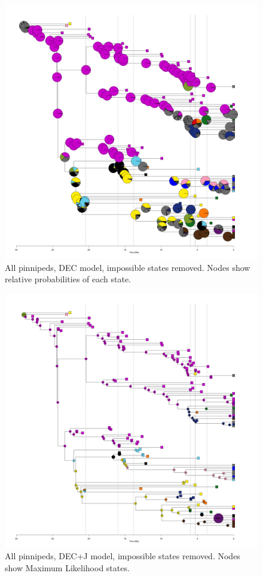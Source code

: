 \documentclass[a4paper, 12pt]{article}
\begin{document}
\begin{figure}[H]
 \centering
  \includegraphics[width = \linewidth]{figures/all-pinnipeds-DEC-impossible-pies.png}
  \caption{All pinnipeds, DEC model, impossible states removed. Nodes show relative probabilities of each state.}
  \label{fig-all-dec-pie}
\end{figure} 

\begin{figure}[H]
 \centering
  \includegraphics[width = \linewidth]{figures/all-pinnipeds-DECj-impossible-MLstates.png}
  \caption{All pinnipeds, DEC+J model, impossible states removed. Nodes show Maximum Likelihood states.}
  \label{fig-all-decj-ml}
\end{figure} 
\end{document}
